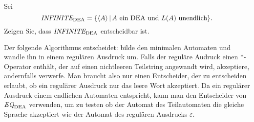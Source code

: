 Sei
\[
\text{\it INFINITE}_{\text{DEA}}
=
\{
\langle A\rangle\,|\,\text{$A$ ein DEA und $L(A)$ unendlich}
\}.
\]
Zeigen Sie, dass $\text{\it INFINITE}_{\text{DEA}}$
entscheidbar ist.


\begin{loesung}
Der folgende Algorithmus entscheidet: bilde den minimalen Automaten und
wandle ihn in einem regulären Ausdruck um. Falls der reguläre
Audruck einen $*$-Operator enthält, der auf einen nichtleeren
Teilstring angewandt wird, akzeptiere, andernfalls verwerfe.
Man braucht also nur einen Entscheider, der  zu entscheiden erlaubt,
ob ein regulärer Ausdruck nur das leere Wort akzeptiert. Da ein
regulärer Ausdruck einem endlichen Automaten entspricht, kann man
den Entscheider von $\text{\it EQ}_{\text{DEA}}$ verwenden, um zu
testen ob der Automat des Teilautomaten die gleiche Sprache akzeptiert
wie der Automat des regulären Ausdrucks $\varepsilon$.
\end{loesung}
